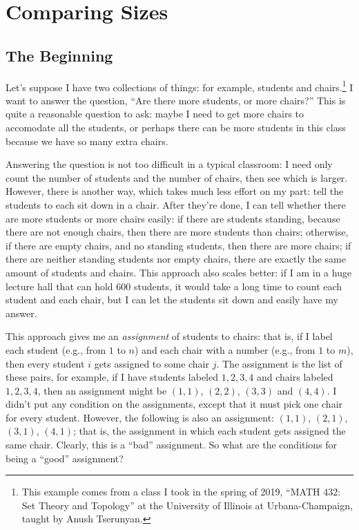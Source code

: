 \documentclass[10pt]{article}
\begin{document}
\section{Comparing Sizes}

\subsection{The Beginning}

Let's suppose I have two collections of things: for example, students and chairs.\footnote{This example comes from a class I took in the spring of 2019, ``MATH 432: Set Theory and Topology'' at the University of Illinois at Urbana-Champaign, taught by Anush Tserunyan.}
I want to answer the question, ``Are there more students, or more chairs?''
This is quite a reasonable question to ask: maybe I need to get more chairs to accomodate all the students, or perhaps there can be more students in this class because we have so many extra chairs.

Answering the question is not too difficult in a typical classroom: I need only count the number of students and the number of chairs, then see which is larger.
However, there is another way, which takes much less effort on my part: tell the students to each sit down in a chair.
After they're done, I can tell whether there are more students or more chairs easily: if there are students standing, because there are not enough chairs, then there are more students than chairs; otherwise, if there are empty chairs, and no standing students, then there are more chairs; if there are neither standing students nor empty chairs, there are exactly the same amount of students and chairs.
This approach also scales better: if I am in a huge lecture hall that can hold 600 students, it would take a long time to count each student and each chair, but I can let the students sit down and easily have my answer.

This approach gives me an \emph{assignment} of students to chairs: that is, if I label each student (e.g., from $1$ to $n$) and each chair with a number (e.g., from $1$ to $m$), then every student $i$ gets assigned to some chair $j$.
The assignment is the list of these pairs, for example, if I have students labeled $1,2,3,4$ and chairs labeled $1,2,3,4$, then an assignment might be $(1,1)$, $(2,2)$, $(3,3)$ and $(4,4)$.
I didn't put any condition on the assignments, except that it must pick one chair for every student.
However, the following is also an assignment: $(1,1)$, $(2,1)$, $(3,1)$, $(4,1)$; that is, the assignment in which each student gets assigned the same chair.
Clearly, this is a ``bad'' assignment.
So what are the conditions for being a ``good'' assignment?
\end{document}
